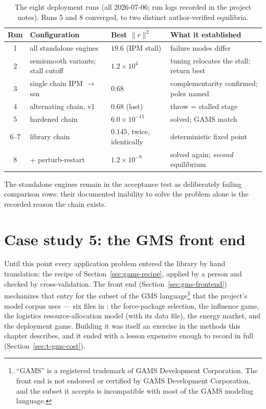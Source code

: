\begin{table}[htbp]
\centering
\small
\begin{tabular}{clll}
\toprule
\textbf{Run} & \textbf{Configuration} & \textbf{Best $\|r\|^2$} &
\textbf{What it established} \\
\midrule
1 & all standalone engines & $19.6$ (IPM stall) & failure modes differ \\
2 & semismooth variants; stall cutoff & $1.2\times 10^{4}$
  & tuning relocates the stall; return best \\
3 & single chain IPM $\to$ ssn & $0.68$ & complementarity confirmed;
  poles named \\
4 & alternating chain, v1 & $0.68$ (lost) & throw = stalled stage \\
5 & hardened chain & $6.0\times 10^{-15}$ & solved; GAMS match \\
6--7 & library chain & $0.145$, twice, identically & deterministic fixed
  point \\
8 & + perturb-restart & $1.2\times 10^{-9}$ & solved again;
  \emph{second} equilibrium \\
\bottomrule
\end{tabular}
\caption{The eight deployment runs (all 2026-07-06; run logs recorded in
the project notes). Runs 5 and 8 converged, to two distinct
author-verified equilibria.}
\label{tab:deploy-runs}
\end{table}

The standalone engines remain in the acceptance test as deliberately
failing comparison rows: their documented inability to solve the problem
alone is the recorded reason the chain exists.

\section{Case study 5: the GMS front end}
\label{sec:t-gms}

Until this point every application problem entered the library by hand
translation: the recipe of Section~\ref{sec:gams-recipe}, applied by a
person and checked by cross-validation. The front end
(Section~\ref{sec:gms-frontend}) mechanizes that entry for the subset of
the GMS language\footnote{``GAMS'' is a registered trademark of GAMS
Development Corporation. The front end is not endorsed or certified by
GAMS Development Corporation, and the subset it accepts is incompatible
with most of the GAMS modeling language.} that the project's model corpus
uses --- six files in : the force-package selection, the
influence game, the logistics resource-allocation model (with its
 data file), the energy market, and the deployment game.
Building it was itself an exercise in the methods this chapter describes,
and it ended with a lesson expensive enough to record in full
(Section~\ref{sec:t-gms-cost}).

